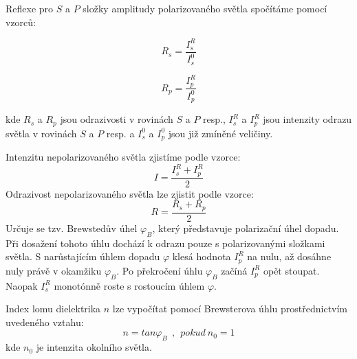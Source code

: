\documentclass[a4paper,11pt]{article}
\begin{document}
    \begin{minipage}[t]{0.5\textwidth} 
            Reflexe pro $S$ a $P$ složky amplitudy polarizovaného světla spočítáme pomocí vzorců:
            \begin{minipage}[t]{0.45\textwidth} 
                \begin{equation}
                    R_s = \frac{I_s^R}{I_s^0}
                \end{equation}
            \end{minipage}
            \begin{minipage}[t]{0.45\textwidth} 
                \begin{equation}
                    R_p = \frac{I_p^R}{I_p^0}
                \end{equation}
            \end{minipage}
            \vspace{10pt}
            \par kde $R_s$ a $R_p$ jsou odrazivosti v rovinách $S$ a $P$ resp., $I_s^R$ a $I_p^R$ jsou intenzity odrazu světla v rovinách $S$ a $P$ resp. a $I_s^0$ a $I_p^0$ jsou již zmíněné veličiny.
            \par Intenzitu nepolarizovaného světla zjistíme podle vzorce: 
            \begin{equation}
                I = \frac{I_s^R + I_p^R}{2}
            \end{equation}
            Odrazivost nepolarizovaného světla lze zjistit podle vzorce: 
            \begin{equation}
                R = \frac{R_s + R_p}{2}
            \end{equation}
            Určuje se tzv. Brewstedův úhel $\varphi_B$, který představuje polarizační úhel dopadu. Při dosažení tohoto úhlu dochází k odrazu pouze s polarizovanými složkami světla. S narůstajícím úhlem dopadu $\varphi$ klesá hodnota $I_p^R$ na nulu, až dosáhne nuly právě v okamžiku $\varphi_B$. Po překročení úhlu $\varphi_B$ začíná $I_p^R$ opět stoupat. Naopak $I_s^R$ monotónně roste s rostoucím úhlem $\varphi$. 
            \par Index lomu dielektrika $n$ lze vypočítat pomocí Brewsterova úhlu prostřednictvím uvedeného vztahu:
            \begin{equation}
                n = tan\varphi_B ~~,~~ pokud~n_0 = 1
            \end{equation}
            kde $n_0$ je intenzita okolního světla.
    \end{minipage}
\newpage
\end{document}

